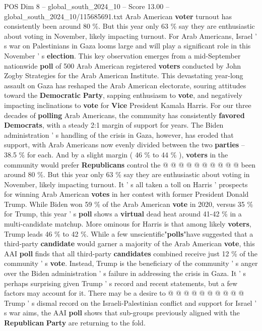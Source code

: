 \begin{textsample}{POS Dim 8 – global\_south\_2024\_10 – Score 13.00 – global\_south\_2024\_10/115685691.txt}  \label{ex:f8_pos_259}
Arab American \textbf{voter} turnout has consistently been around 80 \%.
But this year only 63 \% say they are enthusiastic about voting in November, likely impacting turnout.
For Arab Americans, Israel ' s war on Palestinians in Gaza looms large and will play a significant role in this November ' s \textbf{election}.
This key observation emerges from a mid-September nationwide \textbf{poll} of 500 Arab American registered \textbf{voters} conducted by John Zogby Strategies for the Arab American Institute.
This devastating year-long assault on Gaza has reshaped the Arab American electorate, souring attitudes toward the \textbf{Democratic} \textbf{Party}, sapping enthusiasm to \textbf{vote}, and negatively impacting inclinations to \textbf{vote} for \textbf{Vice} President Kamala Harris.
For our three decades of \textbf{polling} Arab Americans, the community has consistently \textbf{favored} \textbf{Democrats}, with a steady 2:1 margin of support for years.
The Biden administration ' s handling of the crisis in Gaza, however, has eroded that support, with Arab Americans now evenly divided between the two \textbf{parties} -- 38.5 \% for each.
And by a slight margin ( 46 \% to 44 \% ), \textbf{voters} in the community would prefer \textbf{Republicans} control the @ @ @ @ @ @ @ @ @ @ been around 80 \%.
But this year only 63 \% say they are enthusiastic about voting in November, likely impacting turnout.
It ' s all taken a toll on Harris ' prospects for winning Arab American \textbf{votes} in her contest with former President Donald Trump.
While Biden won 59 \% of the Arab American \textbf{vote} in 2020, versus 35 \% for Trump, this year ' s \textbf{poll} shows a \textbf{virtual} dead heat around 41-42 \% in a multi-candidate matchup.
More ominous for Harris is that among likely \textbf{voters}, Trump leads 46 \% to 42 \%.
While a few unscientific"\textbf{polls}"have suggested that a third-party \textbf{candidate} would garner a majority of the Arab American \textbf{vote}, this AAI \textbf{poll} finds that all third-party \textbf{candidates} combined receive just 12 \% of the community ' s \textbf{vote}.
Instead, Trump is the beneficiary of the community ' s anger over the Biden administration ' s failure in addressing the crisis in Gaza.
It ' s perhaps surprising given Trump ' s record and recent statements, but a few factors may account for it.
There may be a desire to @ @ @ @ @ @ @ @ @ @ Trump ' s dismal record on the Israeli-Palestinian conflict and support for Israel ' s war aims, the AAI \textbf{poll} shows that sub-groups previously aligned with the \textbf{Republican} \textbf{Party} are returning to the fold.

\end{textsample}
